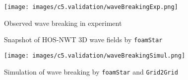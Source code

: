 	{
		\begin{figure} [H]
			\centering
			\texttt{[image: images/c5.validation/waveBreakingExp.png]}
			\vspace{0.1cm}
			\caption{Observed wave breaking in experiment}
			\label{fig:waveBreakingExp}
		\end{figure}
	}	
	
	\pagebreak	
	
	{
		\begin{figure} [H]
			\centering
			 \quad
			\vspace{0.2cm}
			\caption{Snapshot of HOS-NWT 3D wave fields by \texttt{foamStar}}
			\label{fig:extremeWaveComparison}
		\end{figure}
	}
	
	{
		\begin{figure} [H]
			\centering
			\texttt{[image: images/c5.validation/waveBreakingSimul.png]}
			\vspace{0.3cm}
			\caption{Simulation of wave breaking by \texttt{foamStar} and \texttt{Grid2Grid}}		
			\label{fig:waveBreakingSimulation}
		\end{figure}
	}			